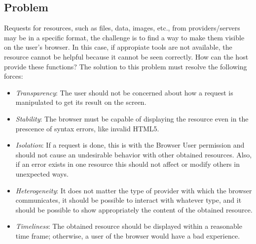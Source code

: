 \documentclass[prodmode,acmtecs]{acmsmall}
\begin{document}
  \subsection*{Problem}
  Requests for resources, such as files, data, images, etc., from providers/servers may be in a specific format, the challenge is to find a way to make them visible on the user's browser. In this case, if appropiate tools are not available, the resource cannot be helpful because it cannot be seen correctly. How can the host provide these functions? The solution to this problem must resolve the following forces:
  \begin{itemize}\leftskip0.8em
    \item \textit{Transparency}: The user should not be concerned about how a request is manipulated to get its result on the screen.
    \item \textit{Stability}: The browser must be capable of displaying the resource even in the prescence of syntax errors, like invalid HTML5.
    \item \textit{Isolation}: If a request is done, this is with the Browser User permission and should not cause an undesirable behavior with other obtained resources. Also, if an error exists in one resource this should not affect or modify others in unexpected ways.
    \item \textit{Heterogeneity}: It does not matter the type of provider with which the browser communicates, it should be possible to interact with whatever type, and it should be possible to show appropriately the content of the obtained resource.
    \item \textit{Timeliness}: The obtained resource should be displayed within a reasonable time frame; otherwise, a user of the browser would have a bad experience.
  \end{itemize}
\end{document}
